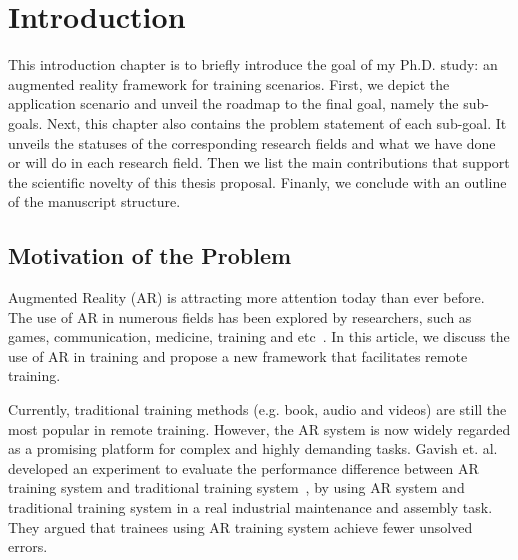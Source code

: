\chapter{Introduction}
\label{cha:i}

This introduction chapter is to briefly introduce the goal of my Ph.D. study: an augmented reality framework for training scenarios. First, we depict the application scenario and unveil the roadmap to the final goal, namely the sub-goals.
Next, this chapter also contains the problem statement of each sub-goal. It unveils the statuses of the corresponding research fields and what we have done or will do in each research field.
Then we list the main contributions that support the scientific novelty of this thesis proposal.
Finanly, we conclude with an outline of the manuscript structure.

\section{Motivation of the Problem}
\label{sec:i:mp}

Augmented Reality (AR) is attracting more attention today than ever before. The use of AR in numerous fields has been explored by researchers, such as games, communication, medicine, training and etc~\cite{nakajima2003,gonzalez-franco2016,hincapie2011,webel2011}.
In this article, we discuss the use of AR in training and propose a new framework that facilitates remote training.

Currently, traditional training methods (e.g. book, audio and videos) are still the most popular in remote training. However, the AR system is now widely regarded as a promising platform for complex and highly demanding tasks.
Gavish et. al. developed an experiment to evaluate the performance difference between AR training system and traditional training system~\cite{gavish2015}, by using AR system and traditional training system in a real industrial maintenance and assembly task. They argued that trainees using AR training system achieve fewer unsolved errors.

